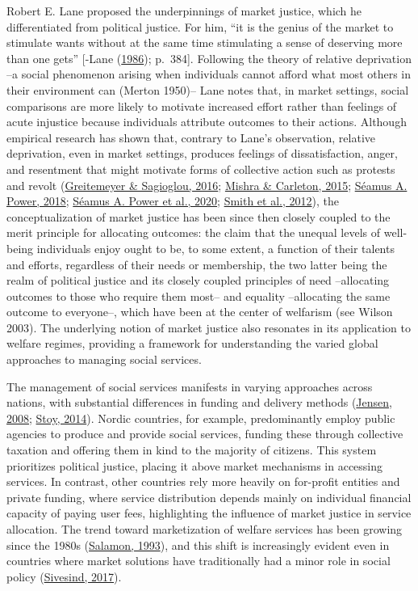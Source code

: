 \documentclass[
  letterpaper,
  DIV=11,
  numbers=noendperiod]{scrartcl}
\begin{document}
Robert E. Lane proposed the underpinnings of market justice, which he
differentiated from political justice. For him, ``it is the genius of
the market to stimulate wants without at the same time stimulating a
sense of deserving more than one gets'' {[}-Lane
(\protect\hyperlink{ref-lane_market_1986}{1986}); p.~384{]}. Following
the theory of relative deprivation --a social phenomenon arising when
individuals cannot afford what most others in their environment can
(Merton 1950)-- Lane notes that, in market settings, social comparisons
are more likely to motivate increased effort rather than feelings of
acute injustice because individuals attribute outcomes to their actions.
Although empirical research has shown that, contrary to Lane's
observation, relative deprivation, even in market settings, produces
feelings of dissatisfaction, anger, and resentment that might motivate
forms of collective action such as protests and revolt
(\protect\hyperlink{ref-greitemeyer_subjective_2016}{Greitemeyer \&
Sagioglou, 2016}; \protect\hyperlink{ref-mishra_subjective_2015}{Mishra
\& Carleton, 2015};
\protect\hyperlink{ref-power_deprivationprotest_2018}{Séamus A. Power,
2018}; \protect\hyperlink{ref-power_relative_2020}{Séamus A. Power et
al., 2020}; \protect\hyperlink{ref-smith_relative_2012}{Smith et al.,
2012}), the conceptualization of market justice has been since then
closely coupled to the merit principle for allocating outcomes: the
claim that the unequal levels of well-being individuals enjoy ought to
be, to some extent, a function of their talents and efforts, regardless
of their needs or membership, the two latter being the realm of
political justice and its closely coupled principles of need
--allocating outcomes to those who require them most-- and equality
--allocating the same outcome to everyone--, which have been at the
center of welfarism (see Wilson 2003). The underlying notion of market
justice also resonates in its application to welfare regimes, providing
a framework for understanding the varied global approaches to managing
social services.

The management of social services manifests in varying approaches across
nations, with substantial differences in funding and delivery methods
(\protect\hyperlink{ref-jensen_worlds_2008}{Jensen, 2008};
\protect\hyperlink{ref-stoy_worlds_2014}{Stoy, 2014}). Nordic countries,
for example, predominantly employ public agencies to produce and provide
social services, funding these through collective taxation and offering
them in kind to the majority of citizens. This system prioritizes
political justice, placing it above market mechanisms in accessing
services. In contrast, other countries rely more heavily on for-profit
entities and private funding, where service distribution depends mainly
on individual financial capacity of paying user fees, highlighting the
influence of market justice in service allocation. The trend toward
marketization of welfare services has been growing since the 1980s
(\protect\hyperlink{ref-salamon_marketization_1993}{Salamon, 1993}), and
this shift is increasingly evident even in countries where market
solutions have traditionally had a minor role in social policy
(\protect\hyperlink{ref-sivesind_changing_2017}{Sivesind, 2017}).
\end{document}
